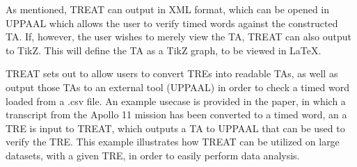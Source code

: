 \documentclass{article}
\begin{document}
As mentioned, TREAT can output in XML format, which can be opened in UPPAAL which allows the user to verify timed words against the constructed TA. If, however, the user wishes to merely view the TA, TREAT can also output to TikZ. This will define the TA as a TikZ graph, to be viewed in LaTeX.

TREAT sets out to allow users to convert TREs into readable TAs, as well as output those TAs to an external tool (UPPAAL) in order to check a timed word loaded from a .csv file.
An example usecase is provided in the paper, in which a transcript from the Apollo 11 mission has been converted to a timed word, an a TRE is input to TREAT, which outputs a TA to UPPAAL that can be used to verify the TRE. This example illustrates how TREAT can be utilized on large datasets, with a given TRE, in order to easily perform data analysis.
\end{document}
